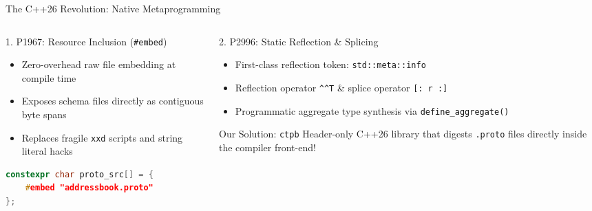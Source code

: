 \documentclass[aspectratio=169,10pt]{beamer}
\begin{document}
\begin{frame}[fragile]{The C++26 Revolution: Native Metaprogramming}
  \begin{columns}[T]
    \begin{column}{0.48\textwidth}
      \begin{block}{1. P1967: Resource Inclusion (\texttt{\#embed})}
        \begin{itemize}
          \item Zero-overhead raw file embedding at compile time
          \item Exposes schema files directly as contiguous byte spans
          \item Replaces fragile \texttt{xxd} scripts and string literal hacks
        \end{itemize}
      \end{block}
      \vspace{0.3em}
      \begin{lstlisting}[language=C++]
constexpr char proto_src[] = {
    #embed "addressbook.proto"
};
      \end{lstlisting}
    \end{column}

    \begin{column}{0.48\textwidth}
      \begin{block}{2. P2996: Static Reflection \& Splicing}
        \begin{itemize}
          \item First-class reflection token: \texttt{std::meta::info}
          \item Reflection operator \texttt{\^{}\^{}T} \& splice operator \texttt{[: r :]}
          \item Programmatic aggregate type synthesis via \texttt{define\_aggregate()}
        \end{itemize}
      \end{block}
      \vspace{0.3em}
      \begin{exampleblock}{Our Solution: \texttt{ctpb}}
        Header-only C++26 library that digests \texttt{.proto} files directly inside the compiler front-end!
      \end{exampleblock}
    \end{column}
  \end{columns}
\end{frame}
\end{document}
